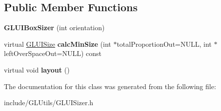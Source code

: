 \subsection*{Public Member Functions}
\begin{DoxyCompactItemize}
\item 
\hypertarget{classCartWheel_1_1GL_1_1GLUIBoxSizer_a92afdc0c89a470a5fc8c49b0ce67861b}{
{\bfseries GLUIBoxSizer} (int orientation)}
\label{classCartWheel_1_1GL_1_1GLUIBoxSizer_a92afdc0c89a470a5fc8c49b0ce67861b}

\item 
\hypertarget{classCartWheel_1_1GL_1_1GLUIBoxSizer_a46bf9ca5128a65a3d15b9f7b1442e853}{
virtual \hyperlink{classCartWheel_1_1GL_1_1GLUISize}{GLUISize} {\bfseries calcMinSize} (int $\ast$totalProportionOut=NULL, int $\ast$leftOverSpaceOut=NULL) const }
\label{classCartWheel_1_1GL_1_1GLUIBoxSizer_a46bf9ca5128a65a3d15b9f7b1442e853}

\item 
\hypertarget{classCartWheel_1_1GL_1_1GLUIBoxSizer_a4516b379b96967f856d60ae1b0cb81db}{
virtual void {\bfseries layout} ()}
\label{classCartWheel_1_1GL_1_1GLUIBoxSizer_a4516b379b96967f856d60ae1b0cb81db}

\end{DoxyCompactItemize}


The documentation for this class was generated from the following file:\begin{DoxyCompactItemize}
\item 
include/GLUtils/GLUISizer.h\end{DoxyCompactItemize}
